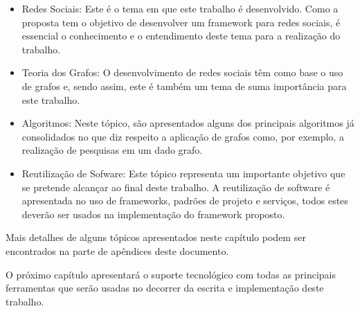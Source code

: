\begin{itemize}
	\item Redes Sociais: Este é o tema em que este trabalho é desenvolvido. Como a proposta tem o objetivo de desenvolver um framework para redes sociais, é essencial o conhecimento e o entendimento deste tema para a realização do trabalho.
	\item Teoria dos Grafos: O desenvolvimento de redes sociais têm como base o uso de grafos e, sendo assim, este é também um tema de suma importância para este trabalho.
	\item Algoritmos: Neste tópico, são apresentados alguns dos principais algoritmos já consolidados no que diz respeito a aplicação de grafos como, por exemplo, a realização de pesquisas em um dado grafo.
	\item Reutilização de Sofware: Este tópico representa um importante objetivo que se pretende alcançar ao final deste trabalho. A reutilização de software é apresentada no uso de frameworks, padrões de projeto e serviços, todos estes deverão ser usados na implementação do framework proposto.
\end{itemize}

Mais detalhes de alguns tópicos apresentados neste capítulo podem ser encontrados na parte de apêndices deste documento.

O próximo capítulo apresentará o suporte tecnológico com todas as principais ferramentas que serão usadas no decorrer da escrita e implementação deste trabalho.
